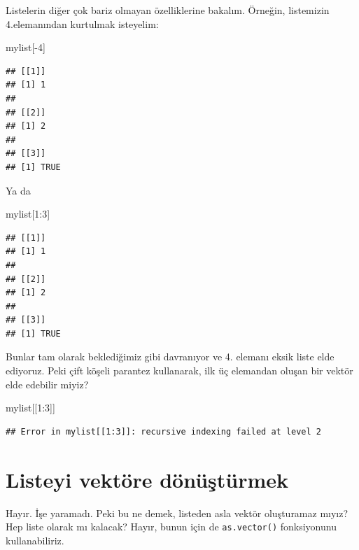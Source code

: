 \documentclass[
]{book}
\newenvironment{Shaded}{\begin{snugshade}}{\end{snugshade}}
\newcommand{\DecValTok}[1]{\textcolor[rgb]{0.00,0.00,0.81}{#1}}
\newcommand{\NormalTok}[1]{#1}
\newcommand{\SpecialCharTok}[1]{\textcolor[rgb]{0.00,0.00,0.00}{#1}}
\begin{document}
Listelerin diğer çok bariz olmayan özelliklerine bakalım. Örneğin, listemizin 4.elemanından kurtulmak isteyelim:

\begin{Shaded}
\begin{Highlighting}[]
\NormalTok{mylist[}\SpecialCharTok{{-}}\DecValTok{4}\NormalTok{]}
\end{Highlighting}
\end{Shaded}

\begin{verbatim}
## [[1]]
## [1] 1
## 
## [[2]]
## [1] 2
## 
## [[3]]
## [1] TRUE
\end{verbatim}

Ya da

\begin{Shaded}
\begin{Highlighting}[]
\NormalTok{mylist[}\DecValTok{1}\SpecialCharTok{:}\DecValTok{3}\NormalTok{]}
\end{Highlighting}
\end{Shaded}

\begin{verbatim}
## [[1]]
## [1] 1
## 
## [[2]]
## [1] 2
## 
## [[3]]
## [1] TRUE
\end{verbatim}

Bunlar tam olarak beklediğimiz gibi davranıyor ve 4. elemanı eksik liste elde ediyoruz. Peki çift köşeli parantez kullanarak, ilk üç elemandan oluşan bir vektör elde edebilir miyiz?

\begin{Shaded}
\begin{Highlighting}[]
\NormalTok{mylist[[}\DecValTok{1}\SpecialCharTok{:}\DecValTok{3}\NormalTok{]]}
\end{Highlighting}
\end{Shaded}

\begin{verbatim}
## Error in mylist[[1:3]]: recursive indexing failed at level 2
\end{verbatim}

\hypertarget{listeyi-vektuxf6re-duxf6nuxfcux15ftuxfcrmek}{%
\section{Listeyi vektöre dönüştürmek}\label{listeyi-vektuxf6re-duxf6nuxfcux15ftuxfcrmek}}

Hayır. İşe yaramadı. Peki bu ne demek, listeden asla vektör oluşturamaz mıyız? Hep liste olarak mı kalacak? Hayır, bunun için de \texttt{as.vector()} fonksiyonunu kullanabiliriz.
\end{document}
